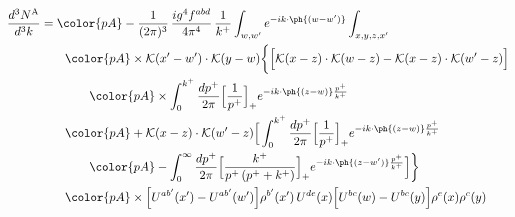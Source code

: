 \begin{align}
\frac{d^{3}N^{\rm A}}{d^{3}k}&={\color{pA}-\frac{1}{(2\pi)^{3}}\,\frac{ig^{4}f^{abd}}{4\pi^{4}}\,\frac{1}{k^{+}}\int_{w,w'}e^{-ik\cdot\ph{(w-w')}}\int_{x,y,z,x'}}\notag\\
&\qquad{\color{pA}\times\mathcal{K}(x'-w')\cdot\mathcal{K}(y-w)\bigg\{\Big[\mathcal{K}(x-z)\cdot\mathcal{K}(w-z)-\mathcal{K}(x-z)\cdot\mathcal{K}(w'-z)\Big]}\notag\\
&\qquad\qquad{\color{pA}\times\int_{0}^{k^{+}}\frac{dp^{+}}{2\pi}\Big[\frac{1}{p^{+}}\Big]_{+}e^{-ik\cdot\ph{(z-w)}\frac{p^{+}}{k^{+}}}}\notag\\
&\qquad{\color{pA}+\mathcal{K}(x-z)\cdot\mathcal{K}(w'-z)\Big[\int_{0}^{k^{+}}\frac{dp^{+}}{2\pi}\Big[\frac{1}{p^{+}}\Big]_{+}e^{-ik\cdot\ph{(z-w)}\frac{p^{+}}{k^{+}}}}\notag\\
&\qquad\qquad{\color{pA}-\int_{0}^{\infty}\frac{dp^{+}}{2\pi}\Big[\frac{k^{+}}{p^{+}\,(p^{+}+k^{+})}\Big]_{+}e^{-ik\cdot\ph{(z-w')}\frac{p^{+}}{k^{+}}}\Big]\bigg\}}\notag\\
&\qquad{\color{pA}\times\Big[U^{ab'}(x')-U^{ab'}(w')\Big]\rho^{b'}(x')\,U^{de}(x)\Big[U^{bc}(w)-U^{bc}(y)\Big]\rho^{e}(x)\rho^{c}(y)}\label{eq:C-A}
\end{align}
